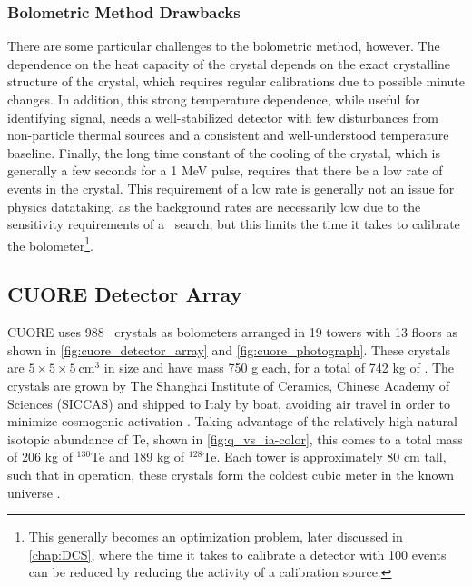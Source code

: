 \subsubsection*{Bolometric Method Drawbacks}
There are some particular challenges to the bolometric method, however.
The dependence on the heat capacity of the crystal depends on the exact crystalline structure of the crystal, which requires regular calibrations due to possible minute changes.
In addition, this strong temperature dependence, while useful for identifying signal, needs a well-stabilized detector with few disturbances from non-particle thermal sources and a consistent and well-understood temperature baseline.
Finally, the long time constant of the cooling of the crystal, which is generally a few seconds for a 1 MeV pulse, requires that there be a low rate of events in the crystal.
This requirement of a low rate is generally not an issue for physics datataking, as the background rates are necessarily low due to the sensitivity requirements of a \zeronubb~search, but this limits the time it takes to calibrate the bolometer\footnote{This generally becomes an optimization problem, later discussed in \autoref{chap:DCS}, where the time it takes to calibrate a detector with 100 events can be reduced by reducing the activity of a calibration source.}.


\subsection{CUORE Detector Array}
CUORE uses 988 \teotwo~crystals as bolometers arranged in 19 towers with 13 floors as shown in \autoref{fig:cuore_detector_array} and \autoref{fig:cuore_photograph}.
These crystals are $5\times5\times5~\textrm{cm}^3$ in size and have mass 750 g each, for a total of 742 kg of \teotwo.
The crystals are grown by The Shanghai Institute of Ceramics, Chinese Academy of Sciences (SICCAS) \cite{Arnaboldi:2010fj} and shipped to Italy by boat, avoiding air travel in order to minimize cosmogenic activation \cite{Barghouty:2010kj}.
Taking advantage of the relatively high natural isotopic abundance of Te, shown in \autoref{fig:q_vs_ia-color}, this comes to a total mass of 206 kg of $^{130}$Te and 189 kg of $^{128}$Te.
Each tower is approximately 80 cm tall, such that in operation, these crystals form the coldest cubic meter in the known universe \cite{Ouellet:2014qua}.

